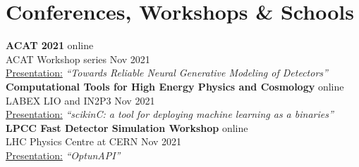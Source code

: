 \newcommand{\event}[2]
  {\normalsize \textbf{\color{hlcolor-0} #1} \hfill {\color{hlcolor-2} #2}}
  
\newcommand{\organizer}[2]
  {\small \color{hlcolor-1} {#1} \hfill {#2}}
  
\newcommand{\contribution}[3][]
  {\normalsize \color{maincolor} \ul{#2:} \emph{``#3''} {#1}}
  
\newcommand{\theme}[1]
  {\normalsize \color{maincolor} \ul{Theme:} \emph{#1}}
  
\newcommand{\button}[2]
  {\large \color{maincolor} \href{#1}{#2}}
  

\section*{Conferences, Workshops \& Schools}
\begin{cvcontent}
  \event{ACAT 2021}{online}\\
  \organizer{ACAT Workshop series}{Nov 2021}\\
  \contribution{Presentation}{Towards Reliable Neural Generative Modeling of Detectors} \hfill
  \button{https://videos.cern.ch/record/2295070}{\faFilm}
  \button{https://indico.cern.ch/event/855454/contributions/4597413/attachments/2355449/4019660/Mokhnenko\%20ACAT\%202021.pdf}{\faFilePdf[regular]}
  \button{https://indico.cern.ch/event/855454/}{\faGlobe}
  \\ [4mm]
  \event{Computational Tools for High Energy Physics and Cosmology}{online}\\
  \organizer{LABEX LIO and IN2P3}{Nov 2021}\\
  \contribution{Presentation}{scikinC: a tool for deploying machine learning as a binaries} \hfill
  \button{https://indico.cern.ch/event/1076291/contributions/4589153/attachments/2354094/4017941/recording_Anderlini.mp4}{\faFilm}
  \button{https://indico.cern.ch/event/1076291/contributions/4589153/attachments/2354094/4016662/scikinC\%20-\%20Computing\%20Tools\%20in\%20High\%20Energy\%20Physics.pdf}{\faFilePdf[regular]}
  \button{https://indico.cern.ch/event/1076291/}{\faGlobe}
  \\ [4mm]
  \event{LPCC Fast Detector Simulation Workshop}{online}\\
  \organizer{LHC Physics Centre at CERN}{Nov 2021}\\
  \contribution{Presentation}{OptunAPI} \hfill

\end{cvcontent}
